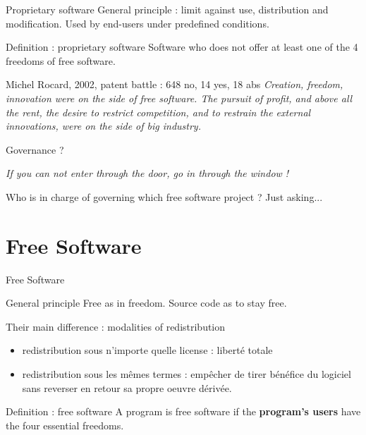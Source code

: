 \documentclass{beamer}
\begin{document}
\begin{frame}{Proprietary software}
  General principle : limit against use, distribution and modification. Used by end-users under predefined conditions.

  \begin{alertblock}{Definition : proprietary software}
    Software who does not offer at least one of the 4 freedoms of free software.    
  \end{alertblock}

\pause

  \begin{block}{Michel Rocard, 2002, patent battle : 648 no, 14 yes, 18 abs}
   \textit{Creation, freedom, innovation were on the side of free software. The pursuit of profit, and above all the rent, the desire to restrict competition, and to restrain the external innovations, were on the side of big industry.}
  \end{block}
\end{frame}

\begin{frame}{Governance ?}
  
\textit{If you can not enter through the door, go in through the window !}

Who is in charge of governing which free software project ? Just asking...

\end{frame}


\section{Free Software}


\begin{frame}{Free Software}

  \begin{alertblock}{General principle}
    Free as in freedom. Source code as to stay free.
  \end{alertblock}
  Their main difference : modalities of redistribution
  \begin{itemize}
  \item redistribution sous n'importe quelle license : liberté totale
  \item redistribution sous les mêmes termes : empêcher de tirer bénéfice du logiciel sans reverser en retour sa propre oeuvre dérivée.
  \end{itemize}

  \begin{alertblock}{Definition : free software}
   A program is free software if the \textbf{program's users} have the four essential freedoms.
  \end{alertblock}
  
\end{frame}
\end{document}
